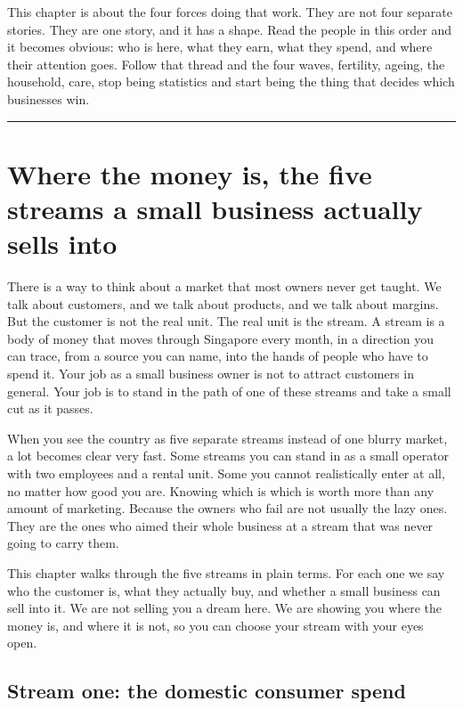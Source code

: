 \documentclass[10pt,twoside,openany]{memoir}
\newcommand{\needspacehead}{\needspace{4\baselineskip}}
\let\oldsection\section
\renewcommand{\section}{\needspacehead\oldsection}
\begin{document}
{{{{{{{{{{{{{{This chapter is about the four forces doing that work. They are not four
separate stories. They are one story, and it has a shape. Read the
people in this order and it becomes obvious: who is here, what they
earn, what they spend, and where their attention goes. Follow that
thread and the four waves, fertility, ageing, the household, care, stop
being statistics and start being the thing that decides which businesses
win.

\begin{center}\rule{0.5\linewidth}{0.5pt}\end{center}

\FloatBarrier
\chapter{Where the money is, the five streams a small business actually
sells
into}\label{where-the-money-is-the-five-streams-a-small-business-actually-sells-into}

There is a way to think about a market that most owners never get
taught. We talk about customers, and we talk about products, and we talk
about margins. But the customer is not the real unit. The real unit is
the stream. A stream is a body of money that moves through Singapore
every month, in a direction you can trace, from a source you can name,
into the hands of people who have to spend it. Your job as a small
business owner is not to attract customers in general. Your job is to
stand in the path of one of these streams and take a small cut as it
passes.

When you see the country as five separate streams instead of one blurry
market, a lot becomes clear very fast. Some streams you can stand in as
a small operator with two employees and a rental unit. Some you cannot
realistically enter at all, no matter how good you are. Knowing which is
which is worth more than any amount of marketing. Because the owners who
fail are not usually the lazy ones. They are the ones who aimed their
whole business at a stream that was never going to carry them.

This chapter walks through the five streams in plain terms. For each one
we say who the customer is, what they actually buy, and whether a small
business can sell into it. We are not selling you a dream here. We are
showing you where the money is, and where it is not, so you can choose
your stream with your eyes open.

\section{Stream one: the domestic consumer
spend}\label{stream-one-the-domestic-consumer-spend}

}}}}}}}}}}}}}}
\end{document}

